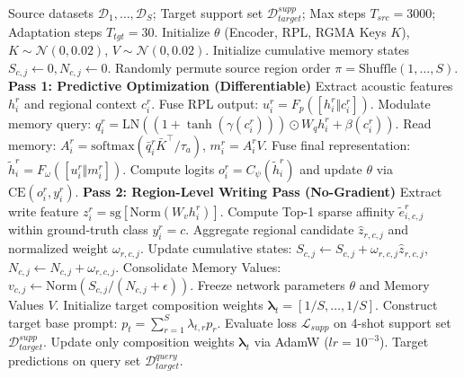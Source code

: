 \documentclass[letterpaper]{article}
\begin{document}
\begin{algorithm}[h]
\caption{Region-Level Read-Before-Write Training and Adaptation}
\label{alg:rc_memnet_verified}
\begin{algorithmic}[1]
\REQUIRE Source datasets $\mathcal{D}_1, \dots, \mathcal{D}_S$; Target support set $\mathcal{D}_{target}^{supp}$; Max steps $T_{src}=3000$; Adaptation steps $T_{tgt}=30$.
\STATE Initialize $\theta$ (Encoder, RPL, RGMA Keys $K$), $K \sim \mathcal{N}(0, 0.02)$, $V \sim \mathcal{N}(0, 0.02)$.
\STATE Initialize cumulative memory states $S_{c,j} \leftarrow 0, N_{c,j} \leftarrow 0$.
    \STATE Randomly permute source region order $\pi = \text{Shuffle}(1, \dots, S)$.
        \STATE \textbf{Pass 1: Predictive Optimization (Differentiable)}
            \STATE Extract acoustic features $h_i^r$ and regional context $c_i^r$.
            \STATE Fuse RPL output: $u_i^r = F_p([h_i^r \Vert c_i^r])$.
            \STATE Modulate memory query: $q_i^r = \text{LN}((1+\tanh(\gamma(c_i^r))) \odot W_q h_i^r + \beta(c_i^r))$.
            \STATE Read memory: $A_i^r = \text{softmax}(\bar q_i^r \bar K^\top / \tau_a)$, $m_i^r = A_i^r V$.
            \STATE Fuse final representation: $\widetilde h_i^r = F_\omega([u_i^r \Vert m_i^r])$.
            \STATE Compute logits $o_i^r = C_\psi(\widetilde h_i^r)$ and update $\theta$ via $\text{CE}(o_i^r, y_i^r)$.
        \ENDFOR
        \STATE \textbf{Pass 2: Region-Level Writing Pass (No-Gradient)}
            \STATE Extract write feature $z_i^r = \text{sg}[\text{Norm}(W_v h_i^r)]$.
            \STATE Compute Top-1 sparse affinity $\widetilde e_{i,c,j}^r$ within ground-truth class $y_i^r = c$.
        \ENDFOR
        \STATE Aggregate regional candidate $\widehat z_{r,c,j}$ and normalized weight $\omega_{r,c,j}$.
        \STATE Update cumulative states: $S_{c,j} \leftarrow S_{c,j} + \omega_{r,c,j}\widehat z_{r,c,j}$, $N_{c,j} \leftarrow N_{c,j} + \omega_{r,c,j}$.
        \STATE Consolidate Memory Values: $v_{c,j} \leftarrow \text{Norm}(S_{c,j} / (N_{c,j} + \epsilon))$.
    \ENDFOR
\ENDFOR
\STATE Freeze network parameters $\theta$ and Memory Values $V$.
\STATE Initialize target composition weights $\boldsymbol{\lambda}_t = [1/S, \dots, 1/S]$.
    \STATE Construct target base prompt: $p_t = \sum_{r=1}^S \lambda_{t,r} p_r$.
    \STATE Evaluate loss $\mathcal{L}_{supp}$ on 4-shot support set $\mathcal{D}_{target}^{supp}$.
    \STATE Update only composition weights $\boldsymbol{\lambda}_t$ via AdamW ($lr=10^{-3}$).
\ENDFOR
\RETURN Target predictions on query set $\mathcal{D}_{target}^{query}$.
\end{algorithmic}
\end{algorithm}
\end{document}
